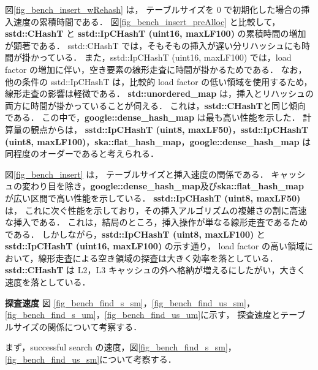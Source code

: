 図\ref{fig_bench_insert_wRehash} は，
テーブルサイズを 0 で初期化した場合の挿入速度の累積時間である．
図\ref{fig_bench_insert_preAlloc} と比較して，
{\bf sstd::CHashT} と {\bf sstd::IpCHashT (uint16, maxLF100)} の累積時間の増加が顕著である．
sstd::CHashT では，そもそもの挿入が遅い分リハッシュにも時間が掛かっている．
また，sstd::IpCHashT (uint16, maxLF100) では，load factor の増加に伴い，空き要素の線形走査に時間が掛かるためである．
なお，他の条件の sstd::IpCHashT は，比較的 load factor の低い領域を使用するため，線形走査の影響は軽微である．
{\bf std::unordered\_map} は，挿入とリハッシュの両方に時間が掛かっていることが伺える．
これは，{\bf sstd::CHashT}と同じ傾向である．
この中で，{\bf google::dense\_hash\_map} は最も高い性能を示した．
計算量の観点からは，
{\bf sstd::IpCHashT (uint8, maxLF50)}，{\bf sstd::IpCHashT (uint8, maxLF100)}，{\bf ska::flat\_hash\_map}，{\bf google::dense\_hash\_map} は
同程度のオーダーであると考えられる．

図\ref{fig_bench_insert} は，
テーブルサイズと挿入速度の関係である．
キャッシュの変わり目を除き，{\bf google::dense\_hash\_map}及び{\bf ska::flat\_hash\_map} が広い区間で高い性能を示している．
{\bf sstd::IpCHashT (uint8, maxLF50)} は，
これに次ぐ性能を示しており，その挿入アルゴリズムの複雑さの割に高速な挿入である．
これは，結局のところ，挿入操作が単なる線形走査であるためである．
しかしながら，{\bf sstd::IpCHashT (uint8, maxLF100)} と {\bf sstd::IpCHashT (uint16, maxLF100)} の示す通り，
load factor の高い領域において，線形走査による空き領域の探査は大きく効率を落としている．
{\bf sstd::CHashT} は L2，L3 キャッシュの外へ格納が増えるにしたがい，大きく速度を落としている．
\leavevmode \newline

%
{\bf 探査速度}
\samepage\newline\indent
図
\ref{fig_bench_find_s_sm}，\ref{fig_bench_find_us_sm}，
\ref{fig_bench_find_s_um}，\ref{fig_bench_find_us_um}に示す，
探査速度とテーブルサイズの関係について考察する．

まず，successful search の速度，図\ref{fig_bench_find_s_sm}，\ref{fig_bench_find_us_sm}について考察する．

